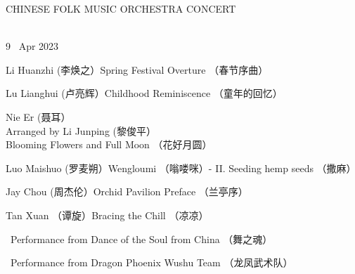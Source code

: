 \documentclass[letter,8pt,poets]{ConcProg}
\begin{document}

 \begin{spacing}{1.0} 
\begin{center}
\Huge{C}\large{HINESE } \Huge{F}\large{OLK} \Huge{M}\large{USIC} \Huge{O}\large{RCHESTRA} \Huge{C}\LARGE{ONCERT}
\end{center}
\begin{programme}{
\\  {\normalsize 9 ~Apr 2023}
}
  \begin{part}[]
    
    
   \begin{composition}{Li Huanzhi (李焕之）}{}{Spring Festival Overture （春节序曲）}{}      
    \end{composition} 
    
    
     \begin{composition}{Lu Lianghui (卢亮辉）}{}{Childhood Reminiscence （童年的回忆）}{}      
    \end{composition} 
    
     \begin{composition}{Nie Er (聂耳）\\ Arranged by Li Junping (黎俊平）}{}{Blooming Flowers and Full Moon （花好月圆）}{}      
    \end{composition} 
    
    \begin{composition}{Luo Maishuo (罗麦朔）}{}{Wengloumi （嗡喽咪）- II. Seeding hemp seeds （撒麻）}{}      
    \end{composition} 
    
    \begin{composition}{Jay Chou (周杰伦）}{}{Orchid Pavilion Preface （兰亭序）}{}      
    \end{composition} 
    
     \begin{composition}{Tan Xuan （谭旋）}{}{Bracing the Chill （凉凉）}{}      
    \end{composition} 
     \begin{composition}{\ }{}{Performance from Dance of the Soul from China （舞之魂）}{}      
    \end{composition} 
    
    \begin{composition}{\ }{}{Performance from Dragon Phoenix Wushu Team （龙凤武术队）}{}      
    \end{composition} 
    

\end{part}
\end{programme}
\end{spacing}
\end{document}
